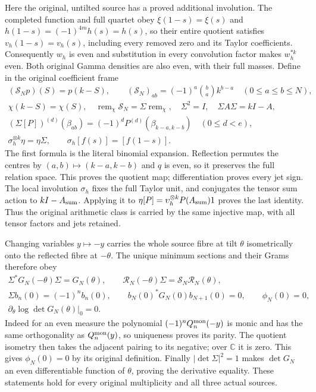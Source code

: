 \documentclass[11pt,a4paper]{article}
\begin{document}
Here the original, untilted source has a proved additional
involution. The completed function and full quartet obey
$\xi(1-s)=\xi(s)$ and $h(1-s)=(-1)^{4m}h(s)=h(s)$, so their
entire quotient satisfies $v_h(1-s)=v_h(s)$, including every
removed zero and its Taylor coefficients. Consequently $w_h$ is
even and substitution in every convolution factor makes $w_h^{*k}$
even. Both original Gamma densities are also even, with their full
masses. Define in the original coefficient frame
\[
 \begin{gathered}
 (\mathscr S_Np)(S)=p(k-S),\qquad
 (\mathscr S_N)_{ab}=(-1)^a\binom ba k^{b-a}\quad(0\le a\le b\le N),\\
 \chi(k-S)=\chi(S),\quad
 \operatorname{rem}_\chi\mathscr S_N=\Sigma\operatorname{rem}_\chi,\quad
 \Sigma^2=I,\quad \Sigma A\Sigma=kI-A,\\
 (\Sigma[P])^{(d)}(\beta_{ab})
           =(-1)^dP^{(d)}(\beta_{k-a,k-b})\quad(0\le d<e),\\
 \sigma_h^{\otimes k}\eta=\eta\Sigma,\qquad
 \sigma_h[f(s)]=[f(1-s)].
 \end{gathered}\tag{OMR23}
\]
The first formula is the literal binomial expansion. Reflection
permutes the centres by $(a,b)\mapsto(k-a,k-b)$ and $q$ is even,
so it preserves the full relation space. This proves the quotient
map; differentiation proves every jet sign. The local involution
$\sigma_h$ fixes the full Taylor unit, and conjugates the tensor
sum action to $kI-A_{\rm sum}$. Applying it to
$\eta[P]=\upsilon_h^{\otimes k}P(A_{\rm sum})1$ proves the last
identity. Thus the original arithmetic class is carried by the
same injective map, with all tensor factors and jets retained.

Changing variables $y\mapsto-y$ carries the whole source fibre
at tilt $\theta$ isometrically onto the reflected fibre at
$-\theta$. The unique minimum sections and their Grams therefore
obey
\[
 \begin{gathered}
 \Sigma^*G_N(-\theta)\Sigma=G_N(\theta),\qquad
 \mathcal R_N(-\theta)\Sigma=\mathscr S_N\mathcal R_N(\theta),\\
 \Sigma b_n(0)=(-1)^n b_n(0),\qquad
 b_N(0)^*G_N(0)b_{N+1}(0)=0,\qquad\phi_N(0)=0,\\
 \left.\partial_\theta\log\det G_N(\theta)\right|_0=0.
 \end{gathered}\tag{OMR24}
\]
Indeed for an even measure the polynomial $(-1)^nQ_n^{\rm mon}(-y)$ is
monic and has the same orthogonality as $Q_n^{\rm mon}(y)$, so uniqueness
proves its parity. The quotient isometry then takes the adjacent
pairing to its negative; over $\mathbb C$ it is zero. This gives
$\phi_N(0)=0$ by its original definition. Finally
$|\det\Sigma|^2=1$ makes $\det G_N$ an even differentiable
function of $\theta$, proving the derivative equality. These
statements hold for every original multiplicity and all three
actual sources.
\end{document}
